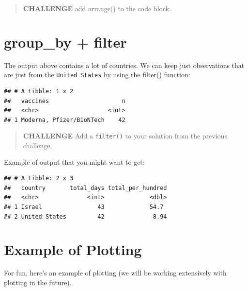 \documentclass[
]{book}
\newenvironment{Shaded}{\begin{snugshade}}{\end{snugshade}}
\newcommand{\KeywordTok}[1]{\textcolor[rgb]{0.13,0.29,0.53}{\textbf{#1}}}
\newcommand{\NormalTok}[1]{#1}
\newcommand{\OperatorTok}[1]{\textcolor[rgb]{0.81,0.36,0.00}{\textbf{#1}}}
\newcommand{\StringTok}[1]{\textcolor[rgb]{0.31,0.60,0.02}{#1}}
\begin{document}
\begin{quote}
\textbf{CHALLENGE} add arrange() to the code block.
\end{quote}

\hypertarget{group_by-filter}{%
\section{group\_by + filter}\label{group_by-filter}}

The output above contains a lot of countries. We can keep just observations that are just from the \texttt{United\ States} by using the filter() function:

\begin{Shaded}
\end{Shaded}

\begin{verbatim}
## # A tibble: 1 x 2
##   vaccines                     n
##   <chr>                    <int>
## 1 Moderna, Pfizer/BioNTech    42
\end{verbatim}

\begin{quote}
\textbf{CHALLENGE} Add a \texttt{filter()} to your solution from the previous challenge.
\end{quote}

Example of output that you might want to get:

\begin{verbatim}
## # A tibble: 2 x 3
##   country       total_days total_per_hundred
##   <chr>              <int>             <dbl>
## 1 Israel                43             54.7 
## 2 United States         42              8.94
\end{verbatim}

\hypertarget{example-of-plotting}{%
\section{Example of Plotting}\label{example-of-plotting}}

For fun, here's an example of plotting (we will be working extensively with plotting in the future).
\end{document}
